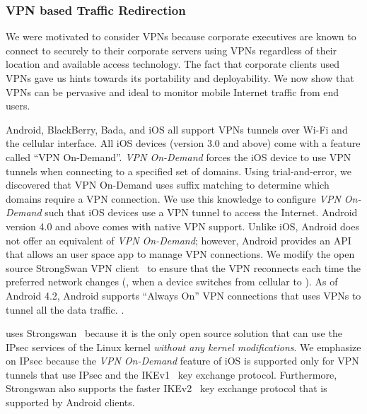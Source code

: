 \subsubsection{VPN based Traffic Redirection} 

We were motivated to consider VPNs because corporate executives are known to connect to securely to their corporate servers using VPNs regardless of their location and available access technology.
The fact that corporate clients used VPNs gave us hints towards its portability and deployability.
We now show that VPNs can be pervasive and ideal to monitor mobile Internet traffic from end users.  

Android, BlackBerry, Bada, and iOS all support VPNs tunnels over Wi-Fi and the cellular interface.
All iOS devices (version 3.0 and above) come with a feature called ``VPN On-Demand''. 
\emph{VPN On-Demand} forces the iOS device to use VPN tunnels when connecting to a specified set of domains. 
Using trial-and-error, we discovered that VPN On-Demand uses suffix matching to determine which domains require a VPN connection. 
We use this knowledge to configure \emph{VPN On-Demand} such that iOS devices use a VPN tunnel to access the Internet. 
Android version 4.0 and above comes with native VPN support. 
Unlike iOS, Android does not offer an equivalent of \emph{VPN On-Demand}; however, Android provides an API that allows an user space app to manage VPN connections. 
We modify the open source StrongSwan VPN client~\cite{strongswanclient} to ensure that the VPN reconnects each time the preferred network changes (\eg, when a device switches from cellular to \wifi). 
As of Android 4.2, Android supports ``Always On'' VPN connections that uses VPNs to tunnel all the data traffic. 
.

\platname uses Strongswan~\cite{strongswan} because it is the only open source solution that can use the IPsec services of the Linux kernel \emph{without any kernel modifications}.
We emphasize on IPsec because the \emph{VPN On-Demand} feature of iOS is supported only for VPN tunnels that use IPsec and the IKEv1~\cite{rfc4109} key exchange protocol.
Furthermore, Strongswan also supports the faster IKEv2~\cite{rfc5996} key exchange protocol that is supported by Android clients.

